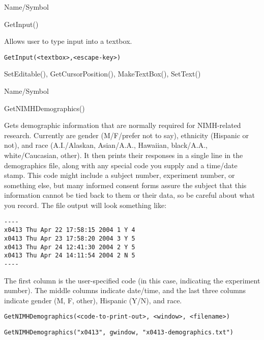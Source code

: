 \rl


\begin{desc}{Name/Symbol}
\item[Name/Symbol]	GetInput()

\item[Description]	Allows user to type input into a textbox.

\item[Usage]
\begin{verbatim}
GetInput(<textbox>,<escape-key>)
\end{verbatim}

\item[Example]	

\item[See Also]	SetEditable(), GetCursorPosition(), MakeTextBox(), SetText()
\end{desc}

\rl



\begin{desc}{Name/Symbol}
\item[Name/Symbol]	GetNIMHDemographics()

\item[Description]	Gets demographic information that are normally required for NIMH-related research.  Currently are gender (M/F/prefer not to say), ethnicity (Hispanic or not), and race (A.I./Alaskan, Asian/A.A., Hawaiian, black/A.A., white/Caucasian, other).  
		It then prints their responses in a single line in the demographics file, along with any special code you supply and a time/date stamp. This code might include a subject number, experiment number, or something else, but many informed consent forms assure the subject that this information cannot be tied back to them or their data, so be careful about what you record. The file output will look something like: 
\begin{verbatim}
---- 
x0413 Thu Apr 22 17:58:15 2004 1 Y 4 
x0413 Thu Apr 23 17:58:20 2004 3 Y 5 
x0413 Thu Apr 24 12:41:30 2004 2 Y 5 
x0413 Thu Apr 24 14:11:54 2004 2 N 5 
---- 
\end{verbatim}


	The first column is the user-specified code (in this 
	case, indicating the experiment number).  The middle columns 
	indicate date/time, and the last three columns indicate 
	gender (M, F, other), Hispanic (Y/N), and race.

\item[Usage]
\begin{verbatim}
GetNIMHDemographics(<code-to-print-out>, <window>, <filename>)
\end{verbatim} 

\item[Example]
\begin{verbatim}
GetNIMHDemographics("x0413", gwindow, "x0413-demographics.txt")
\end{verbatim}

\item[See Also]	
\end{desc}

